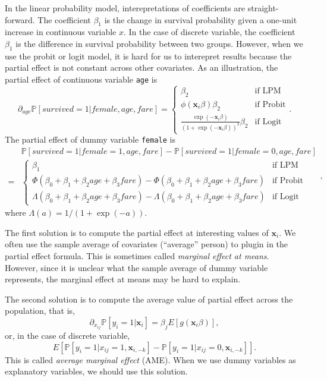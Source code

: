 \documentclass[
  12pt,
]{article}
\begin{document}
In the linear probability model, interepretations of coefficients are
straight-forward. The coefficient \(\beta_1\) is the change in survival
probability given a one-unit increase in continuous variable \(x\). In
the case of discrete variable, the coefficient \(\beta_1\) is the
difference in survival probability between two groups. However, when we
use the probit or logit model, it is hard for us to interepret results
because the partial effect is not constant across other covariates. As
an illustration, the partial effect of continuous variable \texttt{age}
is \begin{equation*}
  \partial_{age} \mathbb{P}[survived = 1 | female, age, fare] =
  \begin{cases}
    \beta_2  &\text{if LPM}  \\
    \phi(\mathbf{x}_i \beta) \beta_2  &\text{if Probit}  \\
    \frac{\exp(-\mathbf{x}_i \beta)}{(1 + \exp(-\mathbf{x}_i \beta))^2} \beta_2 &\text{if Logit}
  \end{cases}.
\end{equation*} The partial effect of dummy variable \texttt{female} is
\begin{equation*}
  \begin{split}
  &\mathbb{P}[survived = 1 | female = 1, age, fare] - \mathbb{P}[survived = 1 | female = 0, age, fare] \\
  =& 
  \begin{cases}
    \beta_1 &\text{if LPM}  \\
    \Phi(\beta_0 + \beta_1 + \beta_2 age + \beta_3 fare) - \Phi(\beta_0 + \beta_1 + \beta_2 age + \beta_3 fare)  &\text{if Probit}  \\
    \Lambda(\beta_0 + \beta_1 + \beta_2 age + \beta_3 fare) - \Lambda(\beta_0 + \beta_1 + \beta_2 age + \beta_3 fare)  &\text{if Logit}
  \end{cases}
  \end{split},
\end{equation*} where \(\Lambda(a) = 1/(1 + \exp(-a))\).

The first solution is to compute the partial effect at interesting
values of \(\mathbf{x}_i\). We often use the sample average of
covariates (``average'' person) to plugin in the partial effect formula.
This is sometimes called \emph{marginal effect at means}. However, since
it is unclear what the sample average of dummy variable represents, the
marginal effect at means may be hard to explain.

The second solution is to compute the average value of partial effect
across the population, that is, \begin{equation*}
  \partial_{x_{ij}} \mathbb{P}[y_i = 1 | \mathbf{x}_i] = \beta_j E[g(\mathbf{x}_i \beta)],
\end{equation*} or, in the case of discrete variable, \begin{equation*}
  E[ \mathbb{P}[y_i = 1 | x_{ij} = 1, \mathbf{x}_{i,-k}] - \mathbb{P}[y_i = 1 | x_{ij} = 0, \mathbf{x}_{i,-k}] ].
\end{equation*} This is called \emph{average marginal effect} (AME).
When we use dummy variables as explanatory variables, we should use this
solution.
\end{document}
